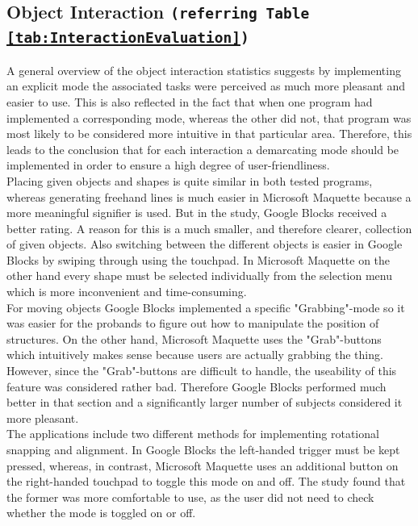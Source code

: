 \documentclass{report}
\begin{document}
		\subsection[Object Interaction]{Object Interaction \small{\texttt{(referring Table \ref{tab:InteractionEvaluation})}}}
		\startsubsection
			A general overview of the object interaction statistics suggests by implementing an explicit mode the associated tasks were perceived as much more pleasant and easier to use. This is also reflected in the fact that when one program had implemented a corresponding mode, whereas the other did not, that program was most likely to be considered more intuitive in that particular area. Therefore, this leads to the conclusion that for each interaction a demarcating mode should be implemented in order to ensure a high degree of user-friendliness. \\
			Placing given objects and shapes is quite similar in both tested programs, whereas generating freehand lines is much easier in Microsoft Maquette because a more meaningful signifier is used. But in the study, Google Blocks received a better rating. A reason for this is a much smaller, and therefore clearer, collection of given objects. Also switching between the different objects is easier in Google Blocks by swiping through using the touchpad. In Microsoft Maquette on the other hand every shape must be selected individually from the selection menu which is more inconvenient and time-consuming. \\
			For moving objects Google Blocks implemented a specific "Grabbing"-mode so it was easier for the probands to figure out how to manipulate the position of structures. On the other hand, Microsoft Maquette uses the "Grab"-buttons which intuitively makes sense because users are actually grabbing the thing. However, since the "Grab"-buttons are difficult to handle, the useability of this feature was considered rather bad. Therefore Google Blocks performed much better in that section and a significantly larger number of subjects considered it more pleasant. \\
			The applications include two different methods for implementing rotational snapping and alignment. In Google Blocks the left-handed trigger must be kept pressed, whereas, in contrast, Microsoft Maquette uses an additional button on the right-handed touchpad to toggle this mode on and off. The study found that the former was more comfortable to use, as the user did not need to check whether the mode is toggled on or off. \\
\end{document}
